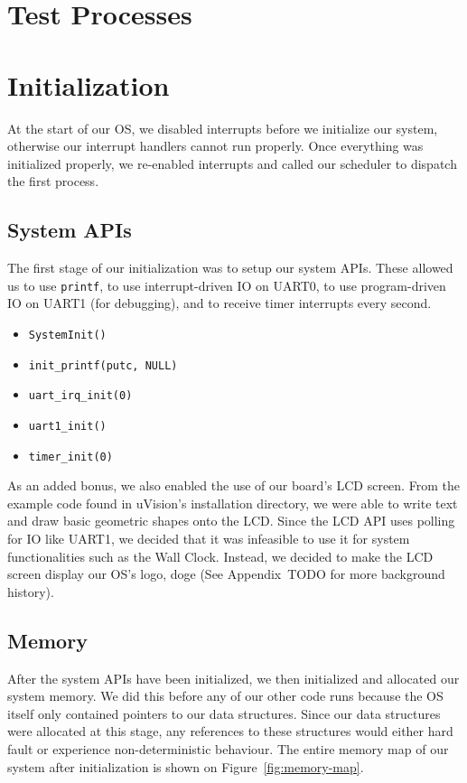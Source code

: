 \documentclass[se]{uw-wkrpt}
\begin{document}
\section{Test Processes}\label{sec:testproc}

\section{Initialization}\label{sec:init}

At the start of our OS, we disabled interrupts before we initialize our system, otherwise our interrupt handlers cannot run properly. Once everything was initialized properly, we re-enabled interrupts and called our scheduler to dispatch the first process.

\subsection{System APIs}
The first stage of our initialization was to setup our system APIs. These allowed us to use \texttt{printf}, to use interrupt-driven IO on UART0, to use program-driven IO on UART1 (for debugging), and to receive timer interrupts every second.

\begin{itemize}
	\item \texttt{SystemInit()}
	\item \texttt{init\_printf(putc, NULL)}	
	\item \texttt{uart\_irq\_init(0)}
	\item \texttt{uart1\_init()}
	\item \texttt{timer\_init(0)}
\end{itemize}

As an added bonus, we also enabled the use of our board's LCD screen. From the example code found in uVision's installation directory, we were able to write text and draw basic geometric shapes onto the LCD. Since the LCD API uses polling for IO like UART1, we decided that it was infeasible to use it for system functionalities such as the Wall Clock. Instead, we decided to make the LCD screen display our OS's logo, doge (See Appendix~TODO for more background history).


\subsection{Memory}
After the system APIs have been initialized, we then initialized and allocated our system memory. We did this before any of our other code runs because the OS itself only contained pointers to our data structures. Since our data structures were allocated at this stage, any references to these structures would either hard fault or experience non-deterministic behaviour. The entire memory map of our system after initialization is shown on Figure~\ref{fig:memory-map}. 
\end{document}
